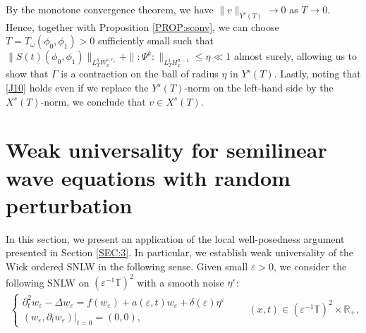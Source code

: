 \documentclass[letterpaper, 11pt,  reqno]{amsart}
\newcommand{\1}{\hspace{0.5mm}\text{I}\hspace{0.5mm}}
\newcommand{\noi}{\noindent}
\newcommand{\R}{\mathbb{R}}
\newcommand{\T}{\mathbb{T}}
\newcommand{\Dl}{\Delta}
\newcommand{\eps}{\varepsilon}
\newcommand{\G}{\Gamma}
\newcommand{\s}{\sigma}
\newcommand{\dt}{\partial_t}
\renewcommand{\o}{\omega}
\newcommand{\les}{\lesssim}
\numberwithin{equation}{section}
\numberwithin{theorem}{section}
\newcommand{\noteherbert}[1]{\marginpar{\color{red} $\Leftarrow\Leftarrow\Leftarrow$}{\color{purple}Herbert: #1}}
\newcommand{\hiro}[1]{\marginpar{\color{red} $\Leftarrow\Leftarrow\Leftarrow$}{\smallskip \noi\color{blue}HIRO: #1}\smallskip}
\begin{document}
By the monotone convergence theorem, 
we have $\| v\|_{Y^s(T)}\to 0$  as $T \to 0$.
Hence, together with Proposition \ref{PROP:sconv}, 
we can choose $T = T_\o(\phi_0, \phi_1)> 0$ sufficiently small such that 
$\|S(t) (\phi_0, \phi_1)\|_{L^q_T  W^{\eps, r_1}_x}
+\| \!:\!\Psi^k \!: \!\|_{L^1_TH^{\s-1}_x} 
\leq \eta  \ll1 $ almost surely, allowing us to show that 
$\G$ is a contraction on the ball of radius $\eta$ in $Y^s(T)$.
Lastly, noting that \eqref{J10} holds even if we replace the $Y^s(T)$-norm on the left-hand side
by the $X^s(T)$-norm, 
we conclude  that $v \in X^s(T)$.
%
%
%
%
%
%
%
%




\section{Weak universality for semilinear wave equations with random
perturbation}
\label{SEC:4}

In this section, we present an application of the local well-posedness argument presented in Section \ref{SEC:3}.
In particular, 
we establish weak universality of the Wick ordered SNLW
in the following sense.
Given small $\eps > 0$, we consider the following  SNLW 
on $(\eps^{- 1} \T)^2$ 
with a smooth noise $\eta^\eps$:
\begin{align}
\begin{cases}
 \dt^2 w_\eps - \Dl w_\eps = f (w_\eps) + a (\eps, t) w_\eps + \delta   (\eps) \eta^\eps \\
 (w_\eps, \dt w_\eps) |_{t = 0}=  (0, 0),
\end{cases}
\qquad 
(x, t)\in (\eps^{- 1} \T)^2 \times \R_+, 
\label{SNLW11}
\end{align}
\end{document}
